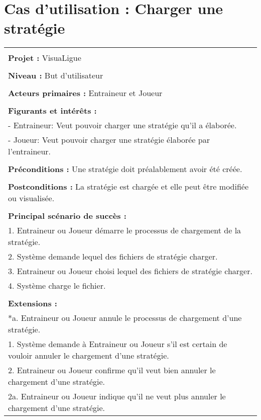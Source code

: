 \section{Cas d'utilisation : Charger une stratégie}
\begin{longtable}{|p{16cm}|}
	\hline
	\\
	\textbf{Projet :} VisuaLigue\\
	\\
	\textbf{Niveau :} But d'utilisateur\\
	\\
	\textbf{Acteurs primaires :} Entraineur et Joueur\\
	\\
	\textbf{Figurants et intérêts :} \\
	- Entraineur: Veut pouvoir charger une stratégie qu'il a élaborée.\\
	- Joueur: Veut pouvoir charger une stratégie élaborée par l'entraineur.\\
	\\
	\textbf{Préconditions :} Une stratégie doit préalablement avoir été créée.\\
	\\
	\textbf{Postconditions :} La stratégie est chargée et elle peut être modifiée ou visualisée.\\
	\\
	\textbf{Principal scénario de succès :}\\
	1. Entraineur ou Joueur démarre le processus de chargement de la stratégie.\\
	2. Système demande lequel des fichiers de stratégie charger.\\
	3. Entraineur ou Joueur choisi lequel des fichiers de stratégie charger.\\
	4. Système charge le fichier.\\
	\\
	\textbf{Extensions :}\\
	*a. Entraineur ou Joueur annule le processus de chargement d'une stratégie.\\
	\hspace{1cm}1. Système demande à Entraineur ou Joueur s'il est certain de vouloir annuler le chargement d'une stratégie.\\
	\hspace{1cm}2. Entraineur ou Joueur confirme qu'il veut bien annuler le chargement d'une stratégie.\\
	\hspace{2cm}2a. Entraineur ou Joueur indique qu'il ne veut plus annuler le chargement d'une stratégie.\\

\end{longtable}
